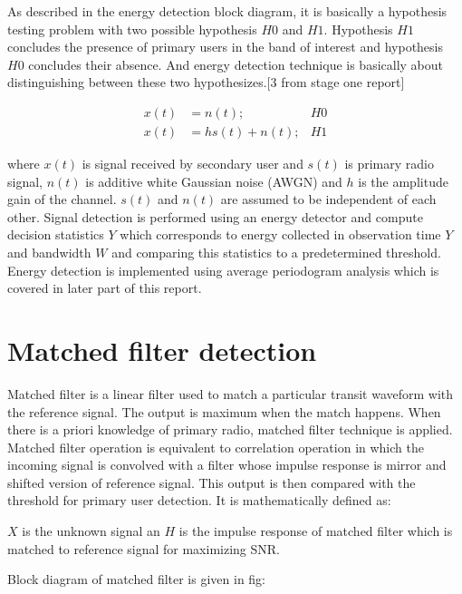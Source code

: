 As described in the energy detection block diagram, it is basically a hypothesis
testing problem with two possible hypothesis $H0$ and $H1$. Hypothesis $H1$ concludes 
the presence of primary users in the band of interest and hypothesis $H0$ 
concludes their absence. And energy detection technique is basically about 
distinguishing between these two hypothesizes.[3 from stage one report]

\begin{align}
x(t) & = n(t); & H0 \nonumber \\
x(t) & = hs(t)+n(t); & H1 \nonumber
\end{align}

where $x(t)$ is signal received by secondary user and $s(t)$ is primary radio 
signal, $n(t)$ is additive white Gaussian noise (AWGN) and $h$ is the amplitude gain
of the channel. $s(t)$ and $n(t)$ are assumed to be independent of each other. 
Signal detection is performed using an energy detector and compute decision 
statistics $Y$ which corresponds to energy collected in observation time $Y$ and 
bandwidth $W$ and comparing this statistics to a predetermined threshold. Energy 
detection is implemented using average periodogram analysis which is covered in 
later part of this report.


\section{Matched filter detection}
Matched filter is a linear filter used to match a particular transit waveform 
with the reference signal. The output is maximum when the match happens. When 
there is a priori knowledge of primary radio, matched filter technique is 
applied. Matched filter operation is equivalent to correlation operation in 
which the incoming signal is convolved with a filter whose impulse response is 
mirror and shifted version of reference signal. This output is then compared 
with the threshold for primary user detection. It is mathematically defined as:


$X$ is the unknown signal an $H$ is the impulse response of matched filter which is 
matched to reference signal for maximizing SNR. 

Block diagram of matched filter is given in fig:

